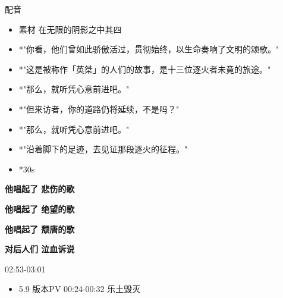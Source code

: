 \documentclass[a4paper]{article}
\begin{document}
配音

\begin{itemize}
    \item 素材 在无限的阴影之中其四
    \item *"你看，他们曾如此骄傲活过，贯彻始终，以生命奏响了文明的颂歌。"
    \item *"这是被称作「英桀」的人们的故事，是十三位逐火者未竟的旅途。"
    \item *"那么，就听凭心意前进吧。"
    \item *"但来访者，你的道路仍将延续，不是吗？"
    \item *"那么，就听凭心意前进吧。"
    \item *"沿着脚下的足迹，去见证那段逐火的征程。"
    \item *30s
\end{itemize}



\textbf{他唱起了 悲伤的歌}

\textbf{他唱起了 绝望的歌}

\textbf{他唱起了 颓唐的歌}

\textbf{对后人们 泣血诉说}

02:53-03:01

\begin{itemize}
    \item 5.9 版本PV 00:24-00:32 乐土毁灭
\end{itemize}
\end{document}
